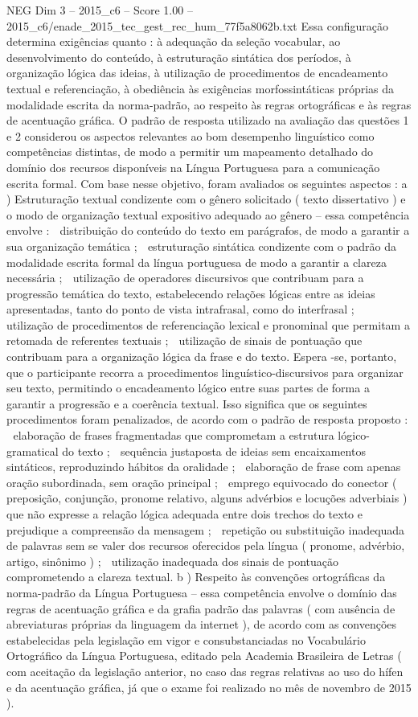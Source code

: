 \begin{textsample}{NEG Dim 3 – 2015\_c6 – Score 1.00 – 2015\_c6/enade\_2015\_tec\_gest\_rec\_hum\_77f5a8062b.txt}
Essa configuração determina exigências quanto : à adequação da seleção vocabular, ao desenvolvimento do conteúdo, à estruturação sintática dos períodos, à organização lógica das ideias, à utilização de procedimentos de encadeamento textual e referenciação, à obediência às exigências morfossintáticas próprias da modalidade escrita da norma-padrão, ao respeito às regras ortográficas e às regras de acentuação gráfica.
O padrão de resposta utilizado na avaliação das questões 1 e 2 considerou os aspectos relevantes ao bom desempenho linguístico como competências distintas, de modo a permitir um mapeamento detalhado do domínio dos recursos disponíveis na Língua Portuguesa para a comunicação escrita formal.
Com base nesse objetivo, foram avaliados os seguintes aspectos : a ) Estruturação textual condizente com o gênero solicitado ( texto dissertativo ) e o modo de organização textual expositivo adequado ao gênero – essa competência envolve :  distribuição do conteúdo do texto em parágrafos, de modo a garantir a sua organização temática ;  estruturação sintática condizente com o padrão da modalidade escrita formal da língua portuguesa de modo a garantir a clareza necessária ;  utilização de operadores discursivos que contribuam para a progressão temática do texto, estabelecendo relações lógicas entre as ideias apresentadas, tanto do ponto de vista intrafrasal, como do interfrasal ;  utilização de procedimentos de referenciação lexical e pronominal que permitam a retomada de referentes textuais ;  utilização de sinais de pontuação que contribuam para a organização lógica da frase e do texto.
Espera -se, portanto, que o participante recorra a procedimentos linguístico-discursivos para organizar seu texto, permitindo o encadeamento lógico entre suas partes de forma a garantir a progressão e a coerência textual.
Isso significa que os seguintes procedimentos foram penalizados, de acordo com o padrão de resposta proposto :  elaboração de frases fragmentadas que comprometam a estrutura lógico-gramatical do texto ;  sequência justaposta de ideias sem encaixamentos sintáticos, reproduzindo hábitos da oralidade ;  elaboração de frase com apenas oração subordinada, sem oração principal ;  emprego equivocado do conector ( preposição, conjunção, pronome relativo, alguns advérbios e locuções adverbiais ) que não expresse a relação lógica adequada entre dois trechos do texto e prejudique a compreensão da mensagem ;  repetição ou substituição inadequada de palavras sem se valer dos recursos oferecidos pela língua ( pronome, advérbio, artigo, sinônimo ) ;  utilização inadequada dos sinais de pontuação comprometendo a clareza textual. b ) Respeito às convenções ortográficas da norma-padrão da Língua Portuguesa – essa competência envolve o domínio das regras de acentuação gráfica e da grafia padrão das palavras ( com ausência de abreviaturas próprias da linguagem da internet ), de acordo com as convenções estabelecidas pela legislação em vigor e consubstanciadas no Vocabulário Ortográfico da Língua Portuguesa, editado pela Academia Brasileira de Letras ( com aceitação da legislação anterior, no caso das regras relativas ao uso do hífen e da acentuação gráfica, já que o exame foi realizado no mês de novembro de 2015 ).

\end{textsample}
